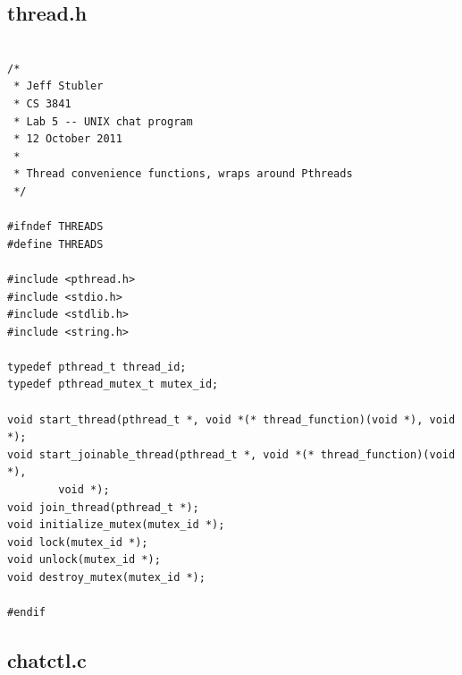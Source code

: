 \documentclass{article}
\begin{document}
\subsection*{thread.h}

\begin{verbatim}

/*
 * Jeff Stubler
 * CS 3841
 * Lab 5 -- UNIX chat program
 * 12 October 2011
 *
 * Thread convenience functions, wraps around Pthreads
 */

#ifndef THREADS
#define THREADS

#include <pthread.h>
#include <stdio.h>
#include <stdlib.h>
#include <string.h>

typedef pthread_t thread_id;
typedef pthread_mutex_t mutex_id;

void start_thread(pthread_t *, void *(* thread_function)(void *), void *);
void start_joinable_thread(pthread_t *, void *(* thread_function)(void *),
        void *);
void join_thread(pthread_t *);
void initialize_mutex(mutex_id *);
void lock(mutex_id *);
void unlock(mutex_id *);
void destroy_mutex(mutex_id *);

#endif

\end{verbatim}

\subsection*{chatctl.c}
\end{document}
